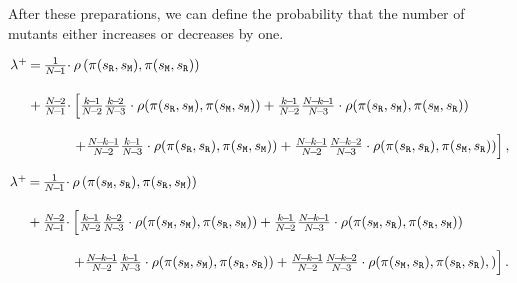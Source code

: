 \documentclass[11pt]{article}
\def\resident{\texttt{R}}
\def\mutant{\texttt{M}}
\def\strategy{s}
\theoremstyle{plainCl1}
\theoremstyle{plainCl2}
\begin{document}
\noindent
After these preparations, we can define the probability that the number of
mutants either increases or decreases by one.

\begin{equation*}
  \setlength{\arraycolsep}{1pt} 
  \begin{array}{llll}
    \lambda^+	 &=
  &\frac{1}{N\!-\!1}\cdot  & \rho\left(\pi (\strategy_\resident, \strategy_\mutant), \pi (\strategy_\mutant, \strategy_\resident)\right)\\[0.5cm]
  &+
  &\frac{N\!-\!2}{N\!-\!1} \cdot 
  &\left[ \frac{k\!-\!1}{N\!-\!2}\frac{k\!-\!2}{N\!-\!3}\cdot \rho(\pi (\strategy_\resident, \strategy_\mutant), \pi (\strategy_\mutant, \strategy_\mutant)) + 
   \frac{k\!-\!1}{N\!-\!2}\frac{N\!-\!k\!-\!1}{N\!-\!3}\cdot \rho(\pi (\strategy_\resident, \strategy_\mutant), \pi (\strategy_\mutant, \strategy_\resident)) \right.\\[0.5cm]
  &&&\left. +\frac{N\!-\!k\!-\!1}{N\!-\!2}\frac{k\!-\!1}{N\!-\!3} \cdot \rho(\pi (\strategy_\resident, \strategy_\resident), \pi (\strategy_\mutant, \strategy_\mutant)) + 
   \frac{N\!-\!k\!-\!1}{N\!-\!2}\frac{N\!-\!k\!-\!2}{N\!-\!3} \cdot \rho(\pi (\strategy_\resident, \strategy_\resident), \pi (\strategy_\mutant, \strategy_\resident))\right],
  \end{array}
\end{equation*}

\begin{equation*}
  \setlength{\arraycolsep}{1pt} 
  \begin{array}{llll}
    \lambda^+	 &=
  &\frac{1}{N\!-\!1}\cdot  & \rho\left(\pi (\strategy_\mutant, \strategy_\resident), \pi(\strategy_\resident, \strategy_\mutant)\right)\\[0.5cm]
  &+
  &\frac{N\!-\!2}{N\!-\!1} \cdot 
  &\left[ \frac{k\!-\!1}{N\!-\!2}\frac{k\!-\!2}{N\!-\!3}\cdot \rho(\pi(\strategy_\mutant, \strategy_\mutant), \pi(\strategy_\resident, \strategy_\mutant)) + 
   \frac{k\!-\!1}{N\!-\!2}\frac{N\!-\!k\!-\!1}{N\!-\!3}\cdot \rho(\pi(\strategy_\mutant, \strategy_\resident), \pi(\strategy_\resident, \strategy_\mutant)) \right.\\[0.5cm]
  &&&\left. +\frac{N\!-\!k\!-\!1}{N\!-\!2}\frac{k\!-\!1}{N\!-\!3} \cdot \rho(\pi(\strategy_\mutant, \strategy_\mutant), \pi(\strategy_\resident, \strategy_\resident)) + 
   \frac{N\!-\!k\!-\!1}{N\!-\!2}\frac{N\!-\!k\!-\!2}{N\!-\!3} \cdot \rho(\pi(\strategy_\mutant, \strategy_\resident), \pi(\strategy_\resident, \strategy_\resident),)\right].
  \end{array}
\end{equation*}
\end{document}
